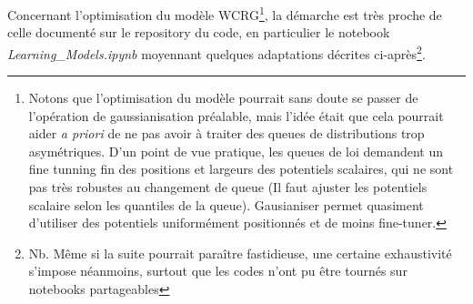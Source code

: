 \documentclass[12pt,twoside]{article}
\begin{document}
Concernant l'optimisation du modèle WCRG\footnote{Notons que l'optimisation du modèle pourrait sans doute se passer de l'opération de gaussianisation préalable, mais l'idée était que cela pourrait aider \textit{a priori} de ne pas avoir à traiter des queues de distributions trop asymétriques.
D'un point de vue pratique, les queues de loi demandent un fine tunning fin des positions et largeurs des potentiels scalaires, qui ne sont pas très robustes au changement de queue (Il faut ajuster les potentiels scalaire selon les quantiles de la queue). Gausianiser permet quasiment d'utiliser des potentiels uniformément positionnés et de moins fine-tuner.}, la démarche est très proche de celle documenté sur le repository du code, en particulier le notebook \textit{Learning\_Models.ipynb} moyennant quelques adaptations décrites ci-après\footnote{Nb. Même si la suite pourrait paraître fastidieuse, une certaine exhaustivité s'impose néanmoins, surtout que les codes n'ont pu être tournés sur notebooks partageables}.
\end{document}
